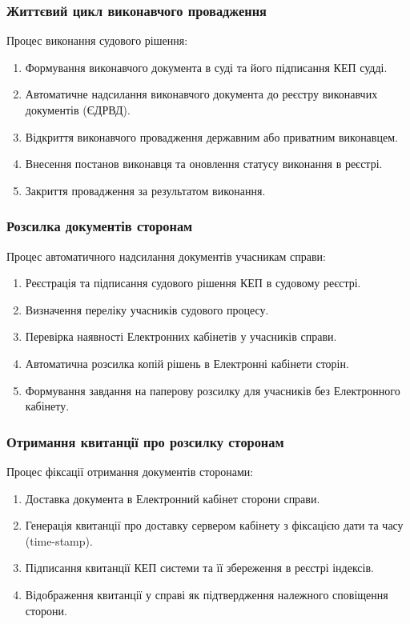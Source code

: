 \documentclass{article}
\begin{document}
\subsubsection{Життєвий цикл виконавчого провадження}
Процес виконання судового рішення:
\begin{enumerate}
    \item Формування виконавчого документа в суді та його підписання КЕП судді.
    \item Автоматичне надсилання виконавчого документа до реєстру виконавчих документів (ЄДРВД).
    \item Відкриття виконавчого провадження державним або приватним виконавцем.
    \item Внесення постанов виконавця та оновлення статусу виконання в реєстрі.
    \item Закриття провадження за результатом виконання.
\end{enumerate}

\subsubsection{Розсилка документів сторонам}
Процес автоматичного надсилання документів учасникам справи:
\begin{enumerate}
    \item Реєстрація та підписання судового рішення КЕП в судовому реєстрі.
    \item Визначення переліку учасників судового процесу.
    \item Перевірка наявності Електронних кабінетів у учасників справи.
    \item Автоматична розсилка копій рішень в Електронні кабінети сторін.
    \item Формування завдання на паперову розсилку для учасників без Електронного кабінету.
\end{enumerate}

\subsubsection{Отримання квитанції про розсилку сторонам}
Процес фіксації отримання документів сторонами:
\begin{enumerate}
    \item Доставка документа в Електронний кабінет сторони справи.
    \item Генерація квитанції про доставку сервером кабінету з фіксацією дати та часу (time-stamp).
    \item Підписання квитанції КЕП системи та її збереження в реєстрі індексів.
    \item Відображення квитанції у справі як підтвердження належного сповіщення сторони.
\end{enumerate}
\end{document}
